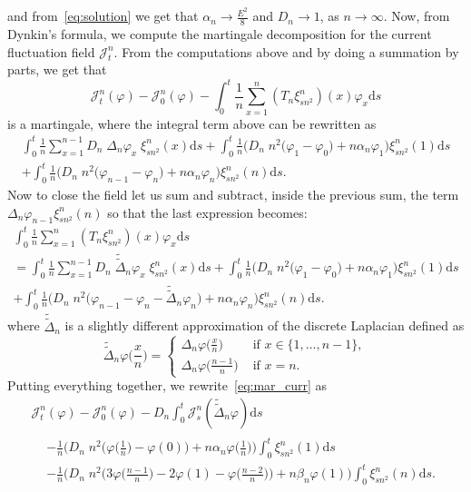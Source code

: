 \documentclass[10pt]{amsart}
\theoremstyle{definition}\newtheorem{defi}[theo]{Definition}\newtheorem{rema}[theo]{Remark}\newtheorem{exam}[theo]{Example}\newtheorem{exem}[theo]{Example}\newtheorem{nota}[theo]{Notation}
\newcommand{\mc}[1]{{\mathcal #1}}
\renewcommand{\mc}[1]{{\mathcal #1}}
\renewcommand{\tilde}{\widetilde}
\newcommand*{\dd}{\mathrm{d}}
\newcommand*{\ds}{\dd s}
\renewcommand{\tfrac}{\frac}
\begin{document}
and from~\eqref{eq:solution} we get that $\alpha_n \to \frac{E^2}{8}$ {and $D_n\to 1$}, as $n\to\infty$. Now, from Dynkin's formula, we compute the martingale decomposition for the current fluctuation field $\mc J_t^n$. From the computations above and by doing a summation by parts, we get that
\begin{equation}\label{eq:mar_curr}
\mc J_t^n(\varphi) - \mc J_0^n(\varphi) -\int_{0}^t
\frac1n \sum_{x=1}^n (T_n \xi_{{sn^2}}^n)(x) \varphi_x \ds
\end{equation}
is a martingale, where the integral term above can be rewritten as
\begin{multline*}
\int_0^t \frac{1}{n} \sum_{x=1}^{n-1} {D_n}\; {\Delta}_n\varphi_x \; \xi_{{sn^2}}^n(x) \ds +\int_0^t\frac 1n \Big({D_n\; n^2}\big(\varphi_1 - \varphi_0\big) + n\alpha_n \varphi_1\Big) \xi_{{sn^2}}^n(1) \ds \\
+\int_0^t\frac 1n \Big({D_n\; n^2} \big(\varphi_{n-1} - \varphi_{n}\big) + n{\alpha_n} \varphi_n\Big) \xi_{{sn^2}}^n(n)\ds.
\end{multline*}
Now to close the field let us sum and subtract, inside the previous sum, the term $\Delta_n \varphi_{n-1} \xi_{sn^2}^n(n)$ so that the last expression becomes:
\begin{multline*}
\int_0^t
\frac1n \sum_{x=1}^n (T_n \xi_{{sn^2}}^n)(x) \varphi_x \ds \\ =\int_0^t \frac{1}{n} \sum_{x=1}^{n-1} {D_n} \; \tilde{\tilde\Delta}_n\varphi_x \; \xi_{{sn^2}}^n(x) \ds +\int_0^t\frac 1n \Big({D_n\; n^2}\big(\varphi_1 - \varphi_0\big) + n\alpha_n \varphi_1\Big) \xi_{{sn^2}}^n(1)\ds\\
+\int_0^t\frac 1n \Big({D_n\; n^2} \big(\varphi_{n-1} - \varphi_{n}-\tilde{\tilde\Delta}_n\varphi_n \big) +n{\alpha_n} \varphi_n\Big) \xi_{{sn^2}}^n(n) \ds.
\end{multline*}
where $\tilde{\tilde\Delta}_n$ is a slightly different approximation of the discrete Laplacian defined as
\begin{equation}\label{eq:lap3}
\tilde{\tilde\Delta}_n\varphi\big(\tfrac x n\big) =
\begin{cases}
\Delta_n\varphi\big(\tfrac x n\big) & \text{ if } x \in\{1,\dots,n-1\},\\
\Delta_n\varphi\big(\tfrac {n-1} n\big) & \text{ if } x = n.
\end{cases}
\end{equation}
Putting everything together, we rewrite~\eqref{eq:mar_curr} as
\begin{multline}
\mc J_t^n(\varphi)-\mc J_0^n(\varphi) - D_n \int_0^t \mc J_s^n(\tilde{\tilde\Delta}_n\varphi)\ds \\
\begin{aligned}
&- \frac 1n\Big({D_n\; n^2}\Big(\varphi\Big(\tfrac 1n\Big)-\varphi(0)\big)+ n\alpha_n\varphi\Big(\tfrac1n\Big)\Big)\int_0^t \xi_{{sn^2}}^n(1) \ds \\
& - \frac 1n\Big({D_n\; n^2} \Big(3\varphi\Big(\tfrac{n-1}{n}\Big)-2\varphi(1)-\varphi\Big(\tfrac{n-2}{n}\Big)\Big)+n\beta_n\varphi(1)\Big) \int_0^t \xi_{{sn^2}}^n(n) \ds. \label{eq:CH2}
\end{aligned}
\end{multline}
\end{document}
